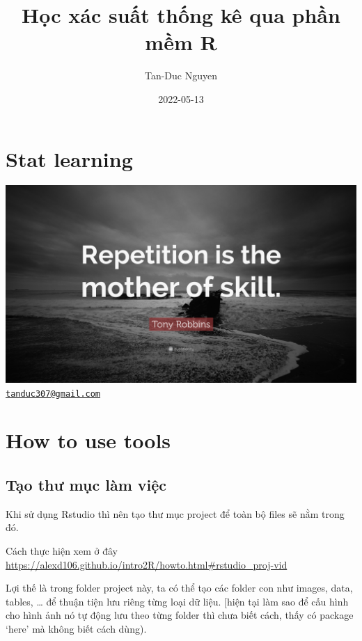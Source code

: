 \documentclass[
]{book}
\title{Học xác suất thống kê qua phần mềm R}
\author{Tan-Duc Nguyen}
\date{2022-05-13}
\theoremstyle{definition}
\theoremstyle{definition}
\theoremstyle{definition}
\theoremstyle{definition}
\theoremstyle{remark}
\begin{document}
\maketitle

{
\setcounter{tocdepth}{1}
\tableofcontents
}
\hypertarget{stat-learning}{%
\chapter{Stat learning}\label{stat-learning}}

\includegraphics[width=1\textwidth,height=\textheight]{images/Quotefancy-237580-3840x2160.jpg}
\href{mailto:tanduc307@gmail.com}{\nolinkurl{tanduc307@gmail.com}}

\hypertarget{how-to-use-tools}{%
\chapter{How to use tools}\label{how-to-use-tools}}

\hypertarget{tux1ea1o-thux1b0-mux1ee5c-luxe0m-viux1ec7c}{%
\section{Tạo thư mục làm việc}\label{tux1ea1o-thux1b0-mux1ee5c-luxe0m-viux1ec7c}}

Khi sử dụng Rstudio thì nên tạo thư mục project để toàn bộ files sẽ nằm trong đó.

Cách thực hiện xem ở đây \url{https://alexd106.github.io/intro2R/howto.html\#rstudio_proj-vid}

Lợi thế là trong folder project này, ta có thể tạo các folder con như images, data, tables, \ldots{} để thuận tiện lưu riêng từng loại dữ liệu. {[}hiện tại làm sao để cấu hình cho hình ảnh nó tự động lưu theo từng folder thì chưa biết cách, thấy có package `here' mà không biết cách dùng).
\end{document}
